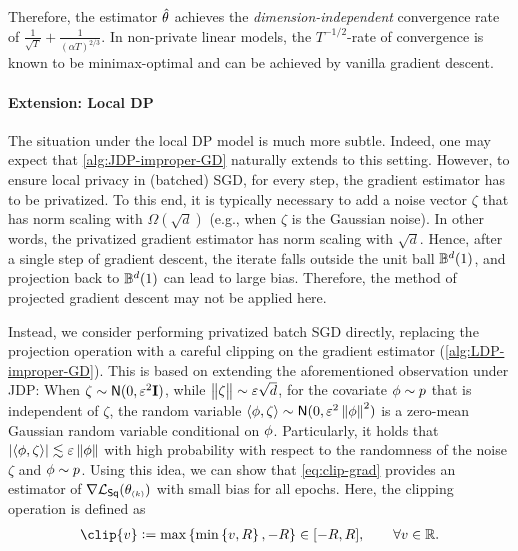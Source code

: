 Therefore, the estimator $\hat{\theta}$ achieves the \emph{dimension-independent} convergence rate of $\frac{1}{\sqrt{T}}+\frac{1}{(\alpha T)^{2/3}}$. In non-private linear models, the $T^{-1/2}$-rate of convergence is known to be minimax-optimal and can be achieved by vanilla gradient descent.

\paragraph{Extension: Local DP}
The situation under the local DP model is much more subtle.
Indeed, one may expect that \cref{alg:JDP-improper-GD} naturally extends to this setting.
However, to ensure local privacy in (batched) SGD, for every step, the gradient estimator
has to be privatized. To this end,
it is typically necessary to add a noise vector $\zeta$ that has norm scaling with $\Omega(\sqrt{d})$ (e.g., when $\zeta$ is the Gaussian noise). In other words, the privatized gradient estimator has norm scaling with $\sqrt{d}$. Hence, after a single step of gradient descent, the iterate falls outside the unit ball $\mathbb{B}^d(1)$, and projection back to $\mathbb{B}^d(1)$ can lead to large bias. Therefore, the method of projected gradient descent may not be applied here.


Instead, we consider performing privatized batch SGD directly, replacing the projection operation with a careful clipping on the gradient estimator (\cref{alg:LDP-improper-GD}). This is based on extending the aforementioned observation under JDP: When $\zeta\sim \mathsf{N}(0,\varepsilon^2\mathbf{I})$, while $\big\|\zeta\big\|\sim \varepsilon \sqrt{d}$, for the covariate $\phi\sim p$ that is independent of $\zeta$, the random variable $\langle \phi,\zeta\rangle\sim \mathsf{N}(0,\varepsilon^2\left\|\phi\right\|^2)$ is a zero-mean Gaussian random variable conditional on $\phi$. Particularly, it holds that $\left|\langle \phi, \zeta\rangle\right|\lesssim \varepsilon\left\|\phi\right\|$ with high probability with respect to the randomness of the noise $\zeta$ and $\phi\sim p$. Using this idea, we can show that \eqref{eq:clip-grad} provides an estimator of $\nabla \mathcal{L}_{\mathsf{Sq}}(\theta_{\scriptscriptstyle{ (k) }})$ with small bias for all epochs. Here, the clipping operation is defined as
\begin{align*}
    \clip{v}\defeq \max\sset{\min\sset{v,R},-R}\in[-R,R], \qquad \forall v\in\R.
\end{align*}

